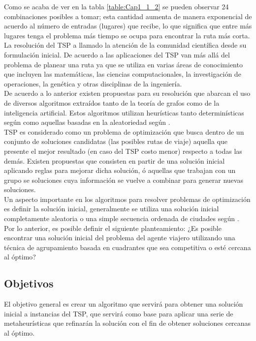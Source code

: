     
\hspace*{1cm}Como se acaba de ver en la tabla \ref {table:Cap1_1_2} se pueden observar 24 combinaciones posibles a tomar; esta cantidad aumenta de manera exponencial de acuerdo al número de entradas (lugares) que recibe, lo que significa que entre más lugares tenga el problema más tiempo se ocupa para encontrar la ruta más corta.\\
\hspace*{1cm}La resolución del TSP a llamado la atención de la comunidad científica desde su formulación inicial. De acuerdo a \cite{[REF2]} las aplicaciones del TSP van más allá del problema de planear una ruta ya que se utiliza en varias áreas de conocimiento que incluyen las matemáticas, las ciencias computacionales, la investigación de operaciones, la genética y otras disciplinas de la ingeniería.\\ 
\hspace*{1cm}De acuerdo a lo anterior existen propuestas para su resolución que abarcan el uso de diversos algoritmos extraídos tanto de la teoría de grafos como de la inteligencia artificial. Estos algoritmos utilizan heurísticas tanto determinísticas según \cite{[REF4]} como aquellas basadas en la aleatoriedad según \cite{[REF5]}.\\
\hspace*{1cm}TSP es considerado como un problema de optimización que busca dentro de un conjunto de soluciones candidatas (las posibles rutas de viaje) aquella que presente el mejor resultado (en caso del TSP costo menor) respecto a todas las demás. Existen propuestas que consisten en partir de una solución inicial aplicando reglas para mejorar dicha solución, ó aquellas que trabajan con un grupo se soluciones cuya información se vuelve a combinar para generar nuevas soluciones.\\
\hspace*{1cm}Un aspecto importante en los algoritmos para resolver problemas de optimización es definir la solución inicial, generalmente se utiliza una solución inicial completamente aleatoria o una simple secuencia ordenada de ciudades según \cite{[REF3]}.\\
\hspace*{1cm}Por lo anterior, es posible definir el siguiente planteamiento: ¿Es posible encontrar una solución inicial del problema del agente viajero utilizando una técnica de agrupamiento basada en cuadrantes que sea competitiva o esté cercana al óptimo?

\subsection{Objetivos}
El objetivo general es crear un algoritmo que servirá para obtener una solución inicial a instancias del TSP, que servirá como base para aplicar una serie de metaheurísticas que refinarán la solución con el fin de obtener soluciones cercanas al óptimo.\\
